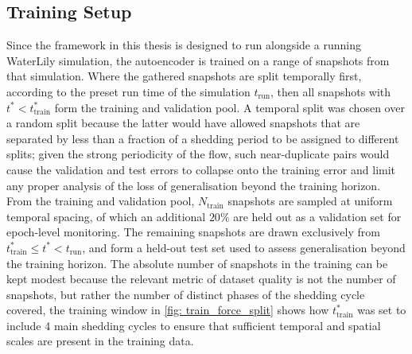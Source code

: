 \subsection{Training Setup}
\label{sect: AEtraining}


Since the framework in this thesis is designed to run alongside a running WaterLily simulation, the autoencoder is trained on a range of snapshots from that simulation. Where the gathered snapshots are split temporally first, according to the preset run time of the simulation $t_\text{run}$, then all snapshots with $t^* < t^*_\text{train}$ form the training and validation pool. A temporal split was chosen over a random split because the latter would have allowed snapshots that are separated by less than a fraction of a shedding period to be assigned to different splits; given the strong periodicity of the flow, such near-duplicate pairs would cause the validation and test errors to collapse onto the training error and limit any proper analysis of the loss of generalisation beyond the training horizon. From the training and validation pool, $N_\text{train}$ snapshots are sampled at uniform temporal spacing, of which an additional $20\%$ are held out as a validation set for epoch-level monitoring. The remaining snapshots are drawn exclusively from $t^*_\text{train} \leq t^* < t_\text{run}$, and form a held-out test set used to assess generalisation beyond the training horizon. The absolute number of snapshots in the training can be kept modest because the relevant metric of dataset quality is not the number of snapshots, but rather the number of distinct phases of the shedding cycle covered, the training window in \autoref{fig: train_force_split} shows how $t^*_\text{train}$ was set to include 4 main shedding cycles to ensure that sufficient temporal and spatial scales are present in the training data. 

